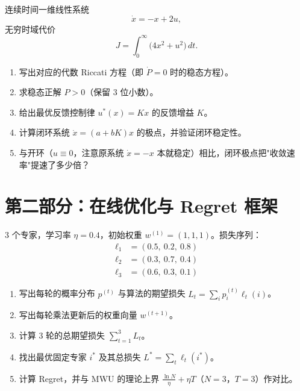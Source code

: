 \documentclass[12pt, a4paper]{ctexart}
\begin{document}
\begin{problem}
连续时间一维线性系统
\[
\dot{x} = -x + 2u,
\]
无穷时域代价
\[
J = \int_0^\infty \big( 4 x^2 + u^2 \big) \, dt.
\]

\begin{enumerate}[label=(\alph*)]
    \item 写出对应的代数 Riccati 方程（即 $\dot{P} = 0$ 时的稳态方程）。
    \item 求稳态正解 $P > 0$（保留 3 位小数）。
    \item 给出最优反馈控制律 $u^*(x) = K x$ 的反馈增益 $K$。
    \item 计算闭环系统 $\dot{x} = (a + bK) x$ 的极点，并验证闭环稳定性。
    \item 与开环（$u \equiv 0$，注意原系统 $\dot{x} = -x$ 本就稳定）相比，闭环极点把"收敛速率"提速了多少倍？
\end{enumerate}
\end{problem}

\bigskip

\section*{第二部分：在线优化与 Regret 框架}

\begin{problem}[第 6 题：MWU 手算 3 轮]
3 个专家，学习率 $\eta = 0.4$，初始权重 $w^{(1)} = (1, 1, 1)$。损失序列：
\begin{align*}
\ell_1 &= (0.5,\ 0.2,\ 0.8) \\
\ell_2 &= (0.3,\ 0.7,\ 0.4) \\
\ell_3 &= (0.6,\ 0.3,\ 0.1)
\end{align*}

\begin{enumerate}[label=(\alph*)]
    \item 写出每轮的概率分布 $p^{(t)}$ 与算法的期望损失 $L_t = \sum_i p_i^{(t)} \ell_t(i)$。
    \item 写出每轮乘法更新后的权重向量 $w^{(t+1)}$。
    \item 计算 3 轮的总期望损失 $\sum_{t=1}^3 L_t$。
    \item 找出最优固定专家 $i^*$ 及其总损失 $L^* = \sum_t \ell_t(i^*)$。
    \item 计算 Regret，并与 MWU 的理论上界 $\frac{\ln N}{\eta} + \eta T$（$N = 3$，$T = 3$）作对比。
\end{enumerate}
\end{problem}
\end{document}
